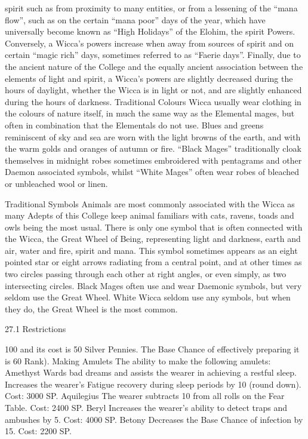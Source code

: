 \documentclass[a4paper]{article}
\begin{document}
\begin{multicols}{3}
spirit such as from proximity to many entities, or
from a lessening of the “mana flow”, such as on
the certain “mana poor” days of the year, which
have universally become known as “High Holidays” of the Elohim, the spirit Powers. Conversely,
a Wicca’s powers increase when away from
sources of spirit and on certain “magic rich” days,
sometimes referred to as “Faerie days”. Finally,
due to the ancient nature of the College and the
equally ancient association between the elements
of light and spirit, a Wicca’s powers are slightly
decreased during the hours of daylight, whether the
Wicca is in light or not, and are slightly enhanced
during the hours of darkness.
Traditional Colours
Wicca usually wear clothing in the colours of
nature itself, in much the same way as the Elemental mages, but often in combination that the Elementals do not use. Blues and greens reminiscent
of sky and sea are worn with the light browns of
the earth, and with the warm golds and oranges of
autumn or fire. “Black Mages” traditionally cloak
themselves in midnight robes sometimes embroidered with pentagrams and other Daemon associated symbols, whilst “White Mages” often wear
robes of bleached or unbleached wool or linen.

Traditional Symbols
Animals are most commonly associated with the
Wicca as many Adepts of this College keep animal
familiars with cats, ravens, toads and owls being
the most usual. There is only one symbol that is
often connected with the Wicca, the Great Wheel
of Being, representing light and darkness, earth and
air, water and fire, spirit and mana. This symbol
sometimes appears as an eight pointed star or eight
arrows radiating from a central point, and at other
times as two circles passing through each other at
right angles, or even simply, as two intersecting
circles. Black Mages often use and wear Daemonic
symbols, but very seldom use the Great Wheel.
White Wicca seldom use any symbols, but when
they do, the Great Wheel is the most common.

27.1 Restrictions

100 and its cost is 50 Silver Pennies. The Base
Chance of effectively preparing it is 60%
Rank).
Making Amulets The ability to make the following amulets:
Amethyst Wards bad dreams and assists the wearer
in achieving a restful sleep. Increases the wearer’s
Fatigue recovery during sleep periods by 10%
(round down). Cost: 3000 SP.
Aquilegius The wearer subtracts 10 from all rolls
on the Fear Table. Cost: 2400 SP.
Beryl Increases the wearer’s ability to detect traps
and ambushes by 5. Cost: 4000 SP.
Betony Decreases the Base Chance of infection by
15. Cost: 2200 SP.


\end{multicols}
\end{document}
